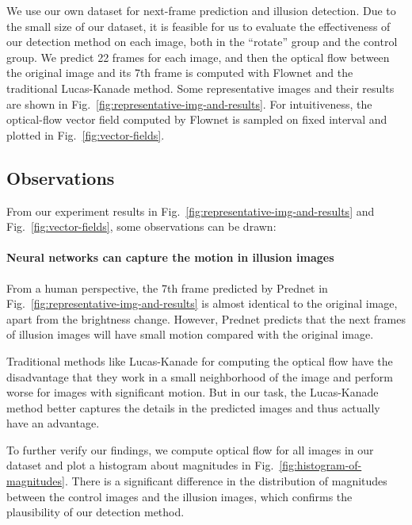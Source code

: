\documentclass[journal]{IEEEtran}
\begin{document}
We use our own dataset for next-frame prediction and illusion detection. Due to the small size of our dataset, it is feasible for us to evaluate the effectiveness of our detection method on each image, both in the ``rotate'' group and the control group. We predict 22 frames for each image, and then the optical flow between the original image and its 7th frame is computed with Flownet and the traditional Lucas-Kanade method. Some representative images and their results are shown in Fig.~\ref{fig:representative-img-and-results}. For intuitiveness, the optical-flow vector field computed by Flownet is sampled on fixed interval and plotted in Fig.~\ref{fig:vector-fields}.

\subsection{Observations}

From our experiment results in Fig.~\ref{fig:representative-img-and-results} and Fig.~\ref{fig:vector-fields}, some observations can be drawn:

\paragraph{Neural networks can capture the motion in illusion images} From a human perspective, the 7th frame predicted by Prednet in Fig.~\ref{fig:representative-img-and-results} is almost identical to the original image, apart from the brightness change. However, Prednet predicts that the next frames of illusion images will have small motion compared with the original image.

Traditional methods like Lucas-Kanade for computing the optical flow have the disadvantage that they work in a small neighborhood of the image and perform worse for images with significant motion. But in our task, the Lucas-Kanade method better captures the details in the predicted images and thus actually have an advantage.

To further verify our findings, we compute optical flow for all images in our dataset and plot a histogram about magnitudes in Fig.~\ref{fig:histogram-of-magnitudes}. There is a significant difference in the distribution of magnitudes between the control images and the illusion images, which confirms the plausibility of our detection method.
\end{document}
